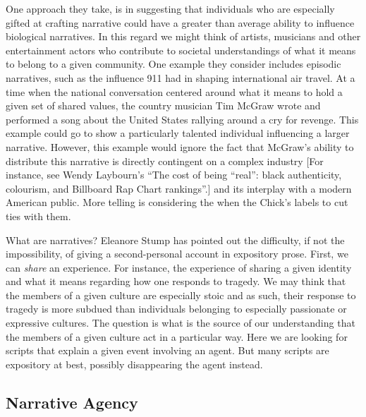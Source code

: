 \documentclass[
  12pt,
]{book}
\theoremstyle{definition}
\theoremstyle{definition}
\theoremstyle{definition}
\theoremstyle{definition}
\theoremstyle{remark}
\begin{document}
One approach they take, is in suggesting that individuals who are especially gifted at crafting narrative could have a greater than average ability to influence biological narratives. In this regard we might think of artists, musicians and other entertainment actors who contribute to societal understandings of what it means to belong to a given community. One example they consider includes episodic narratives, such as the influence 911 had in shaping international air travel. At a time when the national conversation centered around what it means to hold a given set of shared values, the country musician Tim McGraw wrote and performed a song about the United States rallying around a cry for revenge. This example could go to show a particularly talented individual influencing a larger narrative. However, this example would ignore the fact that McGraw's ability to distribute this narrative is directly contingent on a complex industry {[}For instance, see Wendy Laybourn's ``The cost of being ``real'': black authenticity, colourism, and Billboard Rap Chart rankings''.{]} and its interplay with a modern American public. More telling is considering the when the Chick's labels to cut ties with them.

What are narratives? Eleanore Stump has pointed out the difficulty, if not the impossibility, of giving a second-personal account in expository prose. First, we can \emph{share} an experience. For instance, the experience of sharing a given identity and what it means regarding how one responds to tragedy. We may think that the members of a given culture are especially stoic and as such, their response to tragedy is more subdued than individuals belonging to especially passionate or expressive cultures. The question is what is the source of our understanding that the members of a given culture act in a particular way. Here we are looking for scripts that explain a given event involving an agent. But many scripts are expository at best, possibly disappearing the agent instead.

\subsection{Narrative Agency}\label{narrative-agency}
\end{document}

